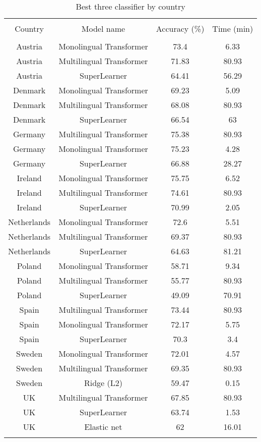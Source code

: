 
\begin{table}[!htbp] \centering 
  \caption{Best three classifier by country} 
  \label{tab:tm-eval-country} 
\begin{tabular}{@{\extracolsep{5pt}} cccc} 
\\[-1.8ex]\hline 
\hline \\[-1.8ex] 
Country & Model name & Accuracy (\%) & Time (min) \\ 
\hline \\[-1.8ex] 
Austria & Monolingual Transformer & 73.4 & 6.33 \\ 
Austria & Multilingual Transformer & 71.83 & 80.93 \\ 
Austria & SuperLearner & 64.41 & 56.29 \\ 
Denmark & Monolingual Transformer & 69.23 & 5.09 \\ 
Denmark & Multilingual Transformer & 68.08 & 80.93 \\ 
Denmark & SuperLearner & 66.54 & 63 \\ 
Germany & Multilingual Transformer & 75.38 & 80.93 \\ 
Germany & Monolingual Transformer & 75.23 & 4.28 \\ 
Germany & SuperLearner & 66.88 & 28.27 \\ 
Ireland & Monolingual Transformer & 75.75 & 6.52 \\ 
Ireland & Multilingual Transformer & 74.61 & 80.93 \\ 
Ireland & SuperLearner & 70.99 & 2.05 \\ 
Netherlands & Monolingual Transformer & 72.6 & 5.51 \\ 
Netherlands & Multilingual Transformer & 69.37 & 80.93 \\ 
Netherlands & SuperLearner & 64.63 & 81.21 \\ 
Poland & Monolingual Transformer & 58.71 & 9.34 \\ 
Poland & Multilingual Transformer & 55.77 & 80.93 \\ 
Poland & SuperLearner & 49.09 & 70.91 \\ 
Spain & Multilingual Transformer & 73.44 & 80.93 \\ 
Spain & Monolingual Transformer & 72.17 & 5.75 \\ 
Spain & SuperLearner & 70.3 & 3.4 \\ 
Sweden & Monolingual Transformer & 72.01 & 4.57 \\ 
Sweden & Multilingual Transformer & 69.35 & 80.93 \\ 
Sweden & Ridge (L2) & 59.47 & 0.15 \\ 
UK & Multilingual Transformer & 67.85 & 80.93 \\ 
UK & SuperLearner & 63.74 & 1.53 \\ 
UK & Elastic net & 62 & 16.01 \\ 
\hline \\[-1.8ex] 
\end{tabular} 
\end{table} 
